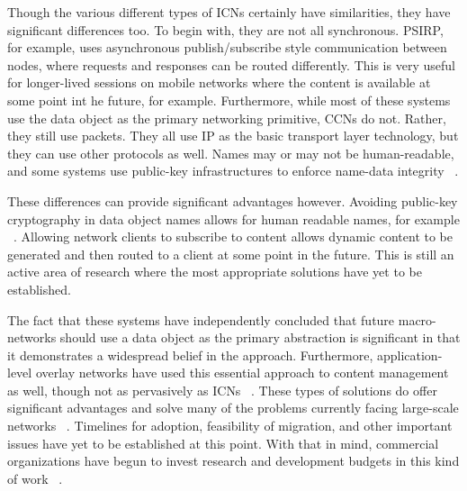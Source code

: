 Though the various different types of ICNs certainly have similarities, they have significant differences too.  To begin with, they are not all synchronous.  PSIRP, for example, uses asynchronous publish/subscribe style communication between nodes, where requests and responses can be routed differently.  This is very useful for longer-lived sessions on mobile networks where the content is available at some point int he future, for example.  Furthermore, while most of these systems use the data object as the primary networking primitive, CCNs do not.  Rather, they still use packets.  They all use IP as the basic transport layer technology, but they can use other protocols as well.  Names may or may not be human-readable, and some systems use public-key infrastructures to enforce name-data integrity ~\cite{6231276}.

These differences can provide significant advantages however.  Avoiding public-key cryptography in data object names allows for human readable names, for example ~\cite{6231276}.  Allowing network clients to subscribe to content allows dynamic content to be generated and then routed to a client at some point in the future.  This is still an active area of research where the most appropriate solutions have yet to be established.

The fact that these systems have independently concluded that future macro-networks should use a data object as the primary abstraction is significant in that it demonstrates a widespread belief in the approach.  Furthermore, application-level overlay networks have used this essential approach to content management as well, though not as pervasively as ICNs ~\cite{Tarkoma:2010:ONT:1805887}.  These types of solutions do offer significant advantages and solve many of the problems currently facing large-scale networks ~\cite{6231276}.  Timelines for adoption, feasibility of migration, and other important issues have yet to be established at this point.  With that in mind, commercial organizations have begun to invest research and development budgets in this kind of work ~\cite{xerox,parc}.  

	